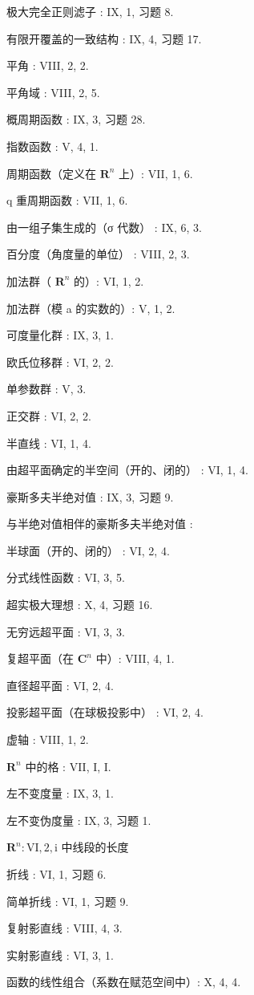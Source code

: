 极大完全正则滤子 : IX, 1, 习题 8.

有限开覆盖的一致结构 : IX, 4, 习题 17.

平角 : VIII, 2, 2.

平角域 : VIII, 2, 5.

概周期函数 : IX, 3, 习题 28.

指数函数 : V, 4, 1.

周期函数（定义在 \(\mathbf{R}^n\) 上）: VII, 1, 6.

q 重周期函数 : VII, 1, 6.

由一组子集生成的（σ 代数） : IX, 6, 3.

百分度（角度量的单位） : VIII, 2, 3.

加法群（ \(\mathbf{R}^n\) 的）: VI, 1, 2.

加法群（模 a 的实数的）: V, 1, 2.

可度量化群 : IX, 3, 1.

欧氏位移群 : VI, 2, 2.

单参数群 : V, 3.

正交群 : VI, 2, 2.

半直线 : VI, 1, 4.

由超平面确定的半空间（开的、闭的） : VI, 1, 4.

豪斯多夫半绝对值 : IX, 3, 习题 9.

与半绝对值相伴的豪斯多夫半绝对值 :

半球面（开的、闭的） : VI, 2, 4.

分式线性函数 : VI, 3, 5.

超实极大理想 : X, 4, 习题 16.

无穷远超平面 : VI, 3, 3.

复超平面（在 \(\mathbf{C}^n\) 中）: VIII, 4, 1.

直径超平面 : VI, 2, 4.

投影超平面（在球极投影中） : VI, 2, 4.

虚轴 : VIII, 1, 2.

\(\mathbf{R}^n\) 中的格 : VII, I, I.

左不变度量 : IX, 3, 1.

左不变伪度量 : IX, 3, 习题 1.

\(\mathbf{R}^n:\mathrm{VI},2,\mathrm{i}\) 中线段的长度

折线 : VI, 1, 习题 6.

简单折线 : VI, 1, 习题 9.

复射影直线 : VIII, 4, 3.

实射影直线 : VI, 3, 1.

函数的线性组合（系数在赋范空间中）: X, 4, 4.

